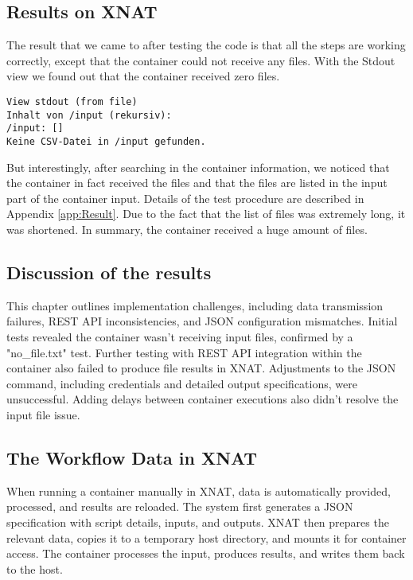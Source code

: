 \subsection{Results on XNAT}
The result that we came to after testing the code is that all the steps are working correctly, except that the container could not receive any files. With the \ac{Stdout} view we found out that the container received zero files. 
 
\begin{lstlisting}[numbers=none]
View stdout (from file)
Inhalt von /input (rekursiv):
/input: []
Keine CSV-Datei in /input gefunden.
\end{lstlisting}


But interestingly, after searching in the container information, we noticed that the container in fact received the files and that the files are listed in the input part of the container input. 
Details of the test procedure are described in Appendix 
\ref{app:Result}. Due to the fact that the list of files was extremely long, it was shortened. In summary, the container received a huge amount of files.

\subsection{Discussion of the results}
This chapter outlines implementation challenges, including data transmission failures, REST API inconsistencies, and JSON configuration mismatches. Initial tests revealed the container wasn't receiving input files, confirmed by a "no\_file.txt" test. Further testing with REST API integration within the container also failed to produce file results in XNAT. Adjustments to the JSON command, including credentials and detailed output specifications, were unsuccessful. Adding delays between container executions also didn't resolve the input file issue.








\subsection{The Workflow Data in XNAT}

When running a container manually in XNAT, data is automatically provided, processed, and results are reloaded. The system first generates a JSON specification with script details, inputs, and outputs. XNAT then prepares the relevant data, copies it to a temporary host directory, and mounts it for container access. The container processes the input, produces results, and writes them back to the host.

